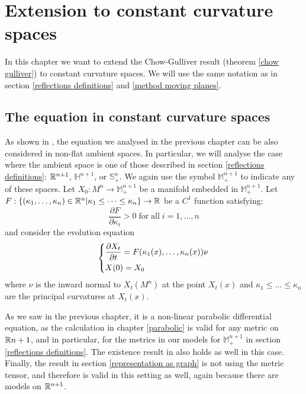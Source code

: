 \chapter{Extension to constant curvature spaces}
In this chapter we want to extend the Chow-Gulliver result (theorem \ref{chow gulliver}) to constant curvature spaces. We will use the same notation as in section 
\ref{reflections definitions} and \ref{method moving planes}. 

\section{The equation in constant curvature spaces}	
As shown in \cite{huisken}, the equation we analysed in the previous chapter can be also considered in non-flat ambient spaces. In particular, we will analyse the case where the ambient space is one of those described  in section \ref{reflections definitions}: $\mathbb{R}^{n+1}$, $\mathbb{H}^{n+1}$, or $\mathbb{S}^n_+$. We again use the symbol $\mathbb{M}^{n+1}_+$ to indicate any of these spaces. 
Let $X_0 : M^n \rightarrow \mathbb{M}^{n+1}_+$ be a manifold embedded in $\mathbb{M}^{n+1}_+$. 
Let $F:\{(\kappa_1, \dots , \kappa_n)\in \mathbb{R}^n\vert \kappa_1\leq \dots \leq \kappa_n\}\rightarrow \mathbb{R}$ be a $C^1$ function satisfying:
\begin{equation}
	\frac{\partial F}{\partial \kappa_i} > 0 \mathrm{\; for \; all } \; i=1,\dots, n \label{parabolicità_ext}
\end{equation}
and consider the evolution equation 
\begin{align}
	\begin{dcases}
		\frac{\partial X_t}{\partial t} = F(\kappa_1(x), \dots , \kappa_n(x)) \nu\\
		X(0)= X_0
	\end{dcases} \label{evolutioneq_ext}
\end{align}
where $\nu$ is the inward normal to $X_t(M^n)$ at the point $X_t(x)$ and $\kappa_1\leq \dots \leq \kappa_n$ are the principal curvatures at $X_t(x)$. 

As we saw in the previous chapter, it is a non-linear parabolic differential equation, as the calculation in chapter \ref{parabolic} is valid for any metric on $\mathbb{R}{n+1}$, and in particular, for the metrics in our models for $\mathbb{M}^{n+1}_+$ in section \ref{reflections definitions}. The existence result in \cite{huisken} also holds as well in this case. Finally, the result in section \ref{representation as graph} is not using the metric tensor, and therefore is valid in this setting as well, again because there are models on $\mathbb{R}^{n+1}$. 

